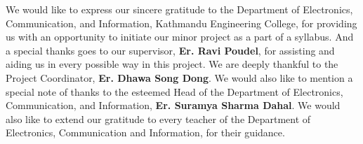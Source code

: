 We would like to express our sincere gratitude to the Department of Electronics, Communication, and Information, Kathmandu Engineering College, for providing us with an opportunity to initiate our minor project as a part of a syllabus. And a special thanks goes to our supervisor, \textbf{Er. Ravi Poudel}, for assisting and aiding us in every possible way in this project. We are deeply thankful to the Project Coordinator, \textbf{Er. Dhawa Song Dong}. We would also like to mention a special note of thanks to the esteemed Head of the Department of Electronics, Communication, and Information, \textbf{Er. Suramya Sharma Dahal}. We would also like to extend our gratitude to every teacher of the Department of Electronics, Communication and Information, for their guidance.